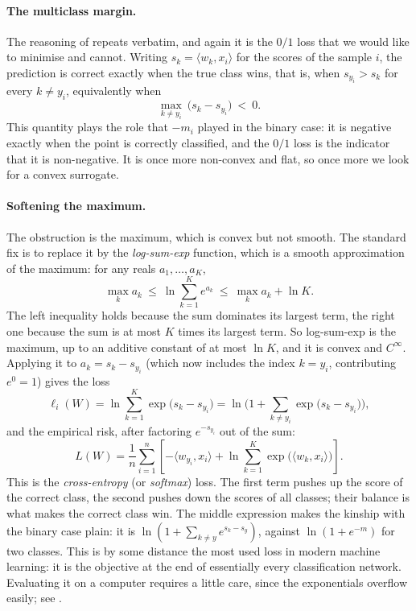 \paragraph{The multiclass margin.}
The reasoning of  repeats verbatim, and again it is the
$0/1$ loss that we would like to minimise and cannot. Writing $s_k = \langle w_k, x_i
\rangle$ for the scores of the sample $i$, the prediction is correct exactly when the
true class wins, that is, when $s_{y_i} > s_k$ for every $k \neq y_i$, equivalently
when
\[
\max_{k \neq y_i} \ \big( s_k - s_{y_i} \big) \ < \ 0 .
\]
This quantity plays the role that $-m_i$ played in the binary case: it is negative
exactly when the point is correctly classified, and the $0/1$ loss is the indicator
that it is non-negative. It is once more non-convex and flat, so once more we look for
a convex surrogate.

\paragraph{Softening the maximum.}
The obstruction is the maximum, which is convex but not smooth. The standard fix is to
replace it by the \emph{log-sum-exp} function, which is a smooth approximation of the
maximum: for any reals $a_1, \dots, a_K$,
\[
\max_{k} a_k \ \leq \ \ln \sum_{k=1}^K e^{a_k} \ \leq \ \max_{k} a_k + \ln K .
\]
The left inequality holds because the sum dominates its largest term, the right one
because the sum is at most $K$ times its largest term. So log-sum-exp is the maximum,
up to an additive constant of at most $\ln K$, and it is convex and $C^\infty$.
Applying it to $a_k = s_k - s_{y_i}$ (which now includes the index $k = y_i$,
contributing $e^0 = 1$) gives the loss
\[
\ell_i(W) = \ln \sum_{k=1}^K \exp\big( s_k - s_{y_i} \big)
= \ln \Big( 1 + \sum_{k \neq y_i} \exp\big( s_k - s_{y_i} \big) \Big) ,
\]
and the empirical risk, after factoring $e^{-s_{y_i}}$ out of the sum:
\[
\boxed{\
L(W) = \frac{1}{n} \sum_{i=1}^n \left[ - \langle w_{y_i}, x_i \rangle
+ \ln \sum_{k=1}^K \exp\big( \langle w_k, x_i \rangle \big) \right] .
\ }
\]
This is the \emph{cross-entropy} (or \emph{softmax}) loss. The first term pushes up the
score of the correct class, the second pushes down the scores of all classes; their
balance is what makes the correct class win. The middle expression makes the kinship
with the binary case plain: it is $\ln(1 + \sum_{k \neq y} e^{s_k - s_y})$, against
$\ln(1 + e^{-m})$ for two classes. This is by some distance the most used loss in
modern machine learning: it is the objective at the end of essentially every
classification network. Evaluating it on a computer requires a little care, since the
exponentials overflow easily; see \Cref{subsec:numerics}.

